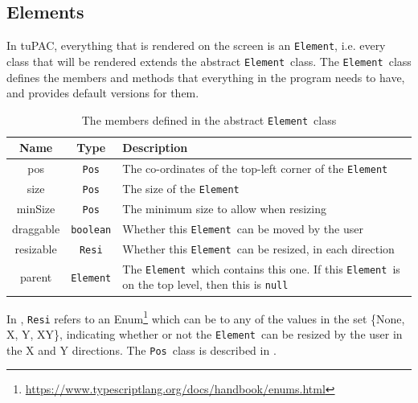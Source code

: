 \documentclass[12pt,a4paper,oneside,openright]{report}
\newcommand{\element}{\texttt{Element}}
\newcommand{\pos}{\texttt{Pos}}
\begin{document}
\subsection{Elements}
In tuPAC, everything that is rendered on the screen is an \element, i.e. every class that will be rendered extends the abstract \element\ class. The \element\ class defines the members and methods that everything in the program needs to have, and provides default versions for them.
\begin{table}[h]
    \centering
    \begin{tabular}{c|c|p{300pt}}
        Name & Type & Description \\
        \hline
        pos & \pos & The co-ordinates of the top-left corner of the \element\\
        size & \pos & The size of the \element\\
        minSize & \pos & The minimum size to allow when resizing\\
        draggable & \verb|boolean| & Whether this \element\ can be moved by the user\\ 
        resizable & \verb|Resi| & Whether this \element\ can be resized, in each direction\\
        parent & \element & The \element\ which contains this one. If this \element\ is on the top level, then this is \verb|null|\\
    \end{tabular}
    \caption{The members defined in the abstract \element\ class}
    \label{tab:element_members}
\end{table}

In , \verb|Resi| refers to an Enum\footnote{\url{https://www.typescriptlang.org/docs/handbook/enums.html}} which can be to any of the values in the set \{None, X, Y, XY\}, indicating whether or not the \element\ can be resized by the user in the X and Y directions. The \pos\ class is described in .
\end{document}
